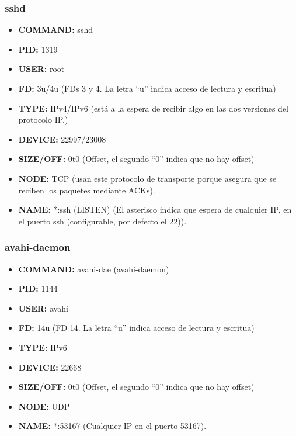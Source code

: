 \documentclass{article}
\begin{document}
\subsubsection*{sshd}
\begin{itemize}
    \item \textbf{COMMAND: }sshd
    \item \textbf{PID: }1319
    \item \textbf{USER: }root
    \item \textbf{FD: }3u/4u (FDs 3 y 4. La letra ``u'' indica acceso de lectura y escritua)
    \item \textbf{TYPE: }IPv4/IPv6 (está a la espera de recibir algo en las dos versiones del protocolo IP.)
    \item \textbf{DEVICE: }22997/23008
    \item \textbf{SIZE/OFF: }0t0 (Offset, el segundo ``0'' indica que no hay offset)
    \item \textbf{NODE: }TCP (usan este protocolo de transporte porque asegura que se reciben los paquetes mediante ACKs).
    \item \textbf{NAME: }*:ssh (LISTEN) (El asterisco indica que espera de cualquier IP, en el puerto ssh (configurable, por defecto el 22)).
\end{itemize}

\subsubsection*{avahi-daemon}
\begin{itemize}
    \item \textbf{COMMAND: }avahi-dae (avahi-daemon)
    \item \textbf{PID: }1144
    \item \textbf{USER: }avahi
    \item \textbf{FD: }14u (FD 14. La letra ``u'' indica acceso de lectura y escritua)
    \item \textbf{TYPE: }IPv6
    \item \textbf{DEVICE: }22668
    \item \textbf{SIZE/OFF: }0t0 (Offset, el segundo ``0'' indica que no hay offset)
    \item \textbf{NODE: }UDP
    \item \textbf{NAME: }*:53167 (Cualquier IP en el puerto 53167).
\end{itemize}


\end{document}
